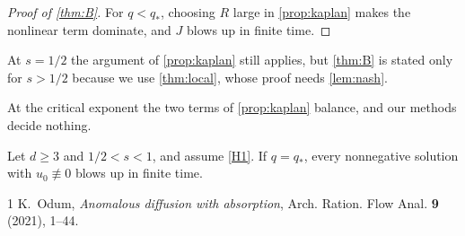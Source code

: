 \documentclass[11pt]{article}
\numberwithin{equation}{section}
\newcommand{\qc}{q_{*}}
\begin{document}
\begin{proof}[Proof of \cref{thm:B}]
For $q < \qc$, choosing $R$ large in \cref{prop:kaplan} makes the nonlinear term dominate, and $J$ blows up in finite time.
\end{proof}

\begin{remark}\label{rem:s-half}
At $s = 1/2$ the argument of \cref{prop:kaplan} still applies, but \cref{thm:B} is stated only for $s > 1/2$ because we use \cref{thm:local}, whose proof needs \cref{lem:nash}.
\end{remark}

At the critical exponent the two terms of \cref{prop:kaplan} balance, and our methods decide nothing.

\begin{conjecture}\label{conj:critical}
Let $d \geq 3$ and $1/2 < s < 1$, and assume \eqref{H1}. If $q = \qc$, every nonnegative solution with $u_0 \not\equiv 0$ blows up in finite time.
\end{conjecture}

\begin{thebibliography}{1}
 K.~Odum, \emph{Anomalous diffusion with absorption}, Arch. Ration. Flow Anal. \textbf{9} (2021), 1--44.
\end{thebibliography}
\end{document}
